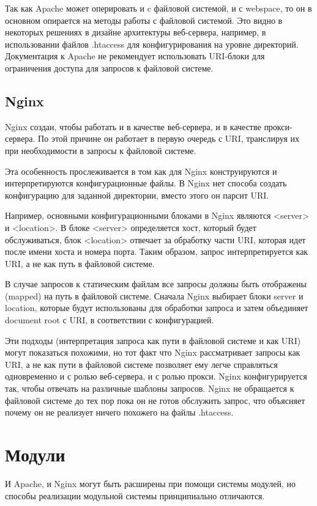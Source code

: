 \documentclass[14pt, a4paper]{article}
\begin{document}
Так как Apache может оперировать и c файловой системой, и с webspace, то он в основном 
опирается на методы работы с файловой системой. Это видно в некоторых решениях в 
дизайне архитектуры веб-сервера, например, в использовании файлов .htaccess для 
конфигурирования на уровне директорий. Документация к Apache не рекомендует использовать 
URI-блоки для ограничения доступа для запросов к файловой системе.

\subsection*{Nginx}
Nginx создан, чтобы работать и в качестве веб-сервера, и в качестве прокси-сервера. По этой 
причине он работает в первую очередь с URI, транслируя их при необходимости в запросы к файловой системе.


Эта особенность прослеживается в том как для Nginx конструируются и интерпретируются конфигурационные 
файлы. В Nginx нет способа создать конфигурацию для заданной директории, вместо этого он парсит URI.


Например, основными конфигурационными блоками в Nginx являются <server> и <location>. В блоке 
<server> определяется хост, который будет обслуживаться, блок <location> отвечает за обработку 
части URI, которая идет после имени хоста и номера порта. Таким образом, запрос интерпретируется 
как URI, а не как путь в файловой системе.


В случае запросов к статическим файлам все запросы должны быть отображены (mapped) на путь 
в файловой системе. Сначала Nginx выбирает блоки server и location, которые будут использованы 
для обработки запроса и затем объединяет document root с URI, в соответствии с конфигурацией.


Эти подходы (интерпретация запроса как пути в файловой системе и как URI) могут показаться 
похожими, но тот факт что Nginx рассматривает запросы как URI, а не как пути в файловой системе 
позволяет ему легче справляться одновременно и с ролью веб-сервера, и с ролью прокси. Nginx 
конфигурируется так, чтобы отвечать на различные шаблоны запросов. Nginx не обращается к 
файловой системе до тех пор пока он не готов обслужить запрос, что объясняет почему он не 
реализует ничего похожего на файлы .htaccess.\\





\section*{Модули}
И Apache, и Nginx могут быть расширены при помощи системы модулей, но способы 
реализации модульной системы принципиально отличаются.
\end{document}
